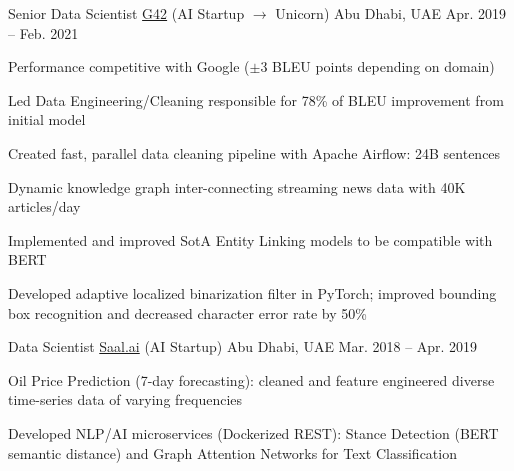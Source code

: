 \begin{cventries}
  \cventry
    {Senior Data Scientist} %
    {\href{https://g42.ai/}{G42} (AI Startup $\rightarrow$ Unicorn)} %
    {Abu Dhabi, UAE} %
    {Apr. 2019 -- Feb. 2021} %
    {
      \begin{cvsubentries}
      \end{cvsubentries}
      \vspace{4mm}
      \begin{cvitems}
        \item {Performance competitive with Google ($\pm$3 BLEU points depending on domain)}
        \item {Led Data Engineering/Cleaning responsible for 78\% of BLEU improvement from initial model}
        \item {Created fast, parallel data cleaning pipeline with Apache Airflow: 24B sentences}
      \end{cvitems}
      \vspace{2mm}
      \begin{cvsubentries}
      \end{cvsubentries}
      \vspace{4mm}
      \begin{cvitems}
        \item {Dynamic knowledge graph inter-connecting streaming news data with 40K articles/day}
        \item {Implemented and improved SotA Entity Linking models to be compatible with BERT}
      \end{cvitems}
      \vspace{2mm}
      \begin{cvsubentries}
      \end{cvsubentries}
      \vspace{4mm}
      \begin{cvitems}
        \item {Developed adaptive localized binarization filter in PyTorch; improved bounding box recognition and decreased character error rate by 50\%}
      \end{cvitems}
    }

  \cventry
    {Data Scientist} %
    {\href{http://saal.ai/}{Saal.ai} (AI Startup)} %
    {Abu Dhabi, UAE} %
    {Mar. 2018 -- Apr. 2019} %
    {
      \begin{cvitems} %
        \item {Oil Price Prediction (7-day forecasting): cleaned and feature engineered diverse time-series data of varying frequencies}
        \item {Developed NLP/AI microservices (Dockerized REST): Stance Detection (BERT semantic distance) and Graph Attention Networks for Text Classification}
      \end{cvitems}
    }


\end{cventries}
